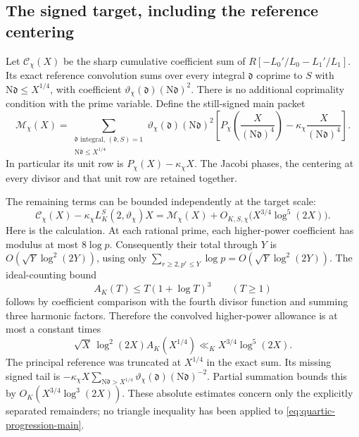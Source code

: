 \documentclass[11pt]{article}
\newcommand{\N}{\mathrm N}
\begin{document}
\subsection{The signed target, including the reference centering}
Let $\mathcal C_\chi(X)$ be the sharp cumulative coefficient sum
of $R[-L_0'/L_0-L_1'/L_1]$. Its exact reference convolution sums
over every integral $\mathfrak d$ coprime to $S$ with
$\N\mathfrak d\le X^{1/4}$, with coefficient
$\vartheta_\chi(\mathfrak d)(\N\mathfrak d)^2$.
There is no additional coprimality condition with the prime variable.
Define the still-signed main packet
\begin{equation}\label{eq:quartic-progression-main}
 \mathcal M_\chi(X)=
 \sum_{\substack{\mathfrak d\text{ integral},\,(\mathfrak d,S)=1\\
                         \N\mathfrak d\le X^{1/4}}}
 \vartheta_\chi(\mathfrak d)(\N\mathfrak d)^2
 \left[
 P_\chi\!\left(\frac{X}{(\N\mathfrak d)^4}\right)
       -\kappa_\chi\frac{X}{(\N\mathfrak d)^4}
 \right].
\end{equation}
In particular its unit row is $P_\chi(X)-\kappa_\chi X$.
The Jacobi phases, the centering at every divisor and that unit row
are retained together.

The remaining terms can be bounded independently at the target scale:
\begin{equation}\label{eq:quartic-progression-remainder}
 \mathcal C_\chi(X)-\kappa_\chi
             L_K^S(2,\vartheta_\chi)X
 =\mathcal M_\chi(X)+O_{K,S,\chi}
                    \bigl(X^{3/4}\log^5(2X)\bigr).
\end{equation}
Here is the calculation. At each rational prime, each higher-power
coefficient has modulus at most $8\log p$.
Consequently their total through $Y$ is
$O(\sqrt Y\log^2(2Y))$, using only
$\sum_{r\ge2,p^r\le Y}\log p=O(\sqrt Y\log^2(2Y))$.
The ideal-counting bound
\[
 A_K(T)\le T(1+\log T)^3\qquad(T\ge1)
\]
follows by coefficient comparison with the fourth divisor function
and summing three harmonic factors. Therefore the convolved
higher-power allowance is at most a constant times
\[
 \sqrt X\,\log^2(2X)A_K(X^{1/4})
       \ll_K X^{3/4}\log^5(2X).
\]
The principal reference was truncated at $X^{1/4}$ in the exact
sum. Its missing signed tail is
$-\kappa_\chi X\sum_{\N\mathfrak d>X^{1/4}}
  \vartheta_\chi(\mathfrak d)(\N\mathfrak d)^{-2}$.
Partial summation bounds this by
$O_K(X^{3/4}\log^3(2X))$. These absolute estimates concern only
the explicitly separated remainders; no triangle inequality has
been applied to \eqref{eq:quartic-progression-main}.
\end{document}
